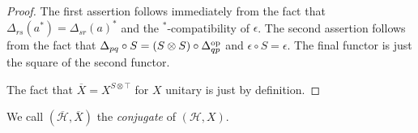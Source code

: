 \begin{proof}
The first assertion follows immediately from the fact that $\Delta_{rs}(a^*)=\Delta_{sr}(a)^*$ and the $^*$-compatibility of $\epsilon$. The second assertion follows from the fact that $\Delta_{pq}\circ S  = (S\otimes S)\circ \Delta_{qp}^{\operatorname{\mathrm{op}}}$ and $\epsilon\circ S = \epsilon$. The final functor is just the square of the second functor. 

The fact that $\overline{X}=X^{S\otimes \top}$ for $X$ unitary is just by definition. %
  
  
  
\end{proof}
We call $(\overline{\mathcal{H}},\overline{X})$ the \emph{conjugate} of 
$(\mathcal{H},X)$.   

